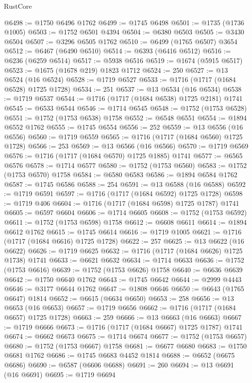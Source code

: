 \begin{lexlean}{RustCore}
\begin{coremodule}
@6498 := @1750 @6496 @1762
@6499 := @1745 @6498
@6501 := @1735 (@1736 @1005)
@6503 := @1752 @6501 @4394
@6504 := @6380 @6503
@6505 := @3430 @6504
@6507 := @3296 @6505 @1762
@6510 := @6499 (@1765 @6507) @3654
@6512 := @6467 (@6490 @6510)
@6514 := @6393 (@6416 @6512)
@6516 := @6236 (@6259 @6514)
@6517 := @5938 @6516
@6519 := @1674 (@5915 @6517)
@6523 := @1675 (@1678 @219) @1823 @1712
@6524 := 250
@6527 := @13 @6524 (@16 @6524)
@6528 := @1719 @6527
@6533 := @1716 (@1717 (@1684 @6528) @1725 @1728)
@6534 := 251
@6537 := @13 @6534 (@16 @6534)
@6538 := @1719 @6537
@6544 := @1716 (@1717 (@1684 @6538) @1725 @2181) @1741
@6545 := @6533 @6544
@6546 := @1714 @6545
@6548 := @1752 (@1753 @6528)
@6551 := @1752 (@1753 @6538) @1758
@6552 := @6548 @6551
@6554 := @1894 @6552 @1762
@6555 := @1745 @6554
@6556 := 252
@6559 := @13 @6556 (@16 @6556)
@6560 := @1719 @6559
@6565 := @1716 (@1717 (@1684 @6560) @1725 @1728)
@6566 := 253
@6569 := @13 @6566 (@16 @6566)
@6570 := @1719 @6569
@6576 := @1716 (@1717 (@1684 @6570) @1725 @1885) @1741
@6577 := @6565 @6576
@6578 := @1714 @6577
@6580 := @1752 (@1753 @6560)
@6583 := @1752 (@1753 @6570) @1758
@6584 := @6580 @6583
@6586 := @1894 @6584 @1762
@6587 := @1745 @6586
@6588 := 254
@6591 := @13 @6588 (@16 @6588)
@6592 := @1719 @6591
@6597 := @1716 (@1717 (@1684 @6592) @1725 @1728)
@6598 := @1719 @406
@6604 := @1716 (@1717 (@1684 @6598) @1725 @1787) @1741
@6605 := @6597 @6604
@6606 := @1714 @6605
@6608 := @1752 (@1753 @6592)
@6611 := @1752 (@1753 @6598) @1758
@6612 := @6608 @6611
@6614 := @1894 @6612 @1762
@6615 := @1745 @6614
@6616 := @1719 @1005
@6621 := @1716 (@1717 (@1684 @6616) @1725 @1728)
@6622 := 257
@6625 := @13 @6622 (@16 @6622)
@6626 := @1719 @6625
@6632 := @1716 (@1717 (@1684 @6626) @1725 @1738) @1741
@6633 := @6621 @6632
@6634 := @1714 @6633
@6636 := @1752 (@1753 @6616)
@6639 := @1752 (@1753 @6626) @1758
@6640 := @6636 @6639
@6642 := @1750 @6640 @1762
@6643 := @1745 @6642
@6644 := @2999 @4443
@6646 := @3177 @6644 @1762
@6647 := @1808 @6646
@6650 := @6643 (@1765 @6647) @1814
@6652 := @6615 (@6634 @6650)
@6653 := 258
@6656 := @13 @6653 (@16 @6653)
@6657 := @1719 @6656
@6662 := @1716 (@1717 (@1684 @6657) @1725 @1728)
@6663 := 259
@6666 := @13 @6663 (@16 @6663)
@6667 := @1719 @6666
@6673 := @1716 (@1717 (@1684 @6667) @1725 @1787) @1741
@6674 := @6662 @6673
@6675 := @1714 @6674
@6677 := @1752 (@1753 @6657)
@6680 := @1752 (@1753 @6667) @1758
@6681 := @6677 @6680
@6683 := @1750 @6681 @1762
@6686 := @1745 @6683 @4452 @1814
@6688 := @6652 (@6675 @6686)
@6690 := @6587 (@6606 @6688)
@6691 := 260
@6694 := @13 @6691 (@16 @6691)
@6695 := @1719 @6694

\end{coremodule}
\end{lexlean}
